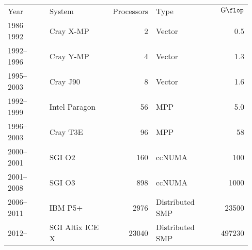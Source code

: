 \bgroup{}
\begin{tabular}{llrlr}
  \hline
  Year & System & Processors & Type & $\SI{}{\giga\flop}$ \\
  \hhline{=====}
  1986--1992 & Cray X-MP & 2 & Vector & 0.5 \\
  1992--1996 & Cray Y-MP & 4 & Vector & 1.3\\
  1995--2003 & Cray J90     & 8 & Vector & 1.6 \\
  1992--1999 & Intel Paragon & 56 & MPP & 5.0\\
  1996--2003 & Cray T3E & 96 & MPP & 58\\
  2000--2001 & SGI O2 & 160 & ccNUMA & 100\\
  2001--2008 & SGI O3 & 898 & ccNUMA & 1000\\
  2006--2011 & IBM P5+ & 2976 & Distributed SMP & 23500\\
  2012--     & SGI Altix ICE X & 23040 & Distributed SMP & 497230 \\
  \hline
\end{tabular}
\egroup
